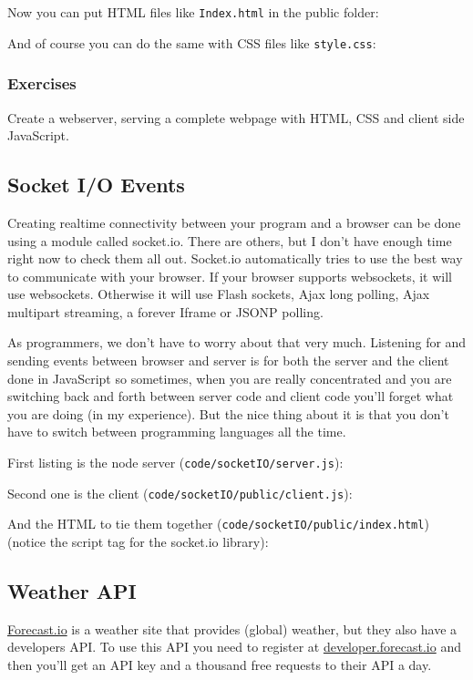 \documentclass[a4paper]{report}
\begin{document}
\noindent Now you can put HTML files like \texttt{Index.html} in the public folder: 
 
 
\noindent And of course you can do the same with CSS files like \texttt{style.css}: 
 
 
\subsubsection*{Exercises} 
Create a webserver, serving a complete webpage with HTML, CSS and client side JavaScript. 
 
\subsection*{Socket I/O Events} 
Creating realtime connectivity between your program and a browser can be done using a module called socket.io. There are others, but I don't have enough time right now to check them all out. Socket.io automatically tries to use the best way to communicate with your browser. If your browser supports websockets, it will use websockets. Otherwise it will use Flash sockets, Ajax long polling, Ajax multipart streaming, a forever Iframe or JSONP polling. 
 
As programmers, we don't have to worry about that very much. Listening for and sending events between browser and server is for both the server and the client done in JavaScript so sometimes, when you are really concentrated and you are switching back and forth between server code and client code you'll forget what you are doing (in my experience). But the nice thing about it is that you don't have to switch between programming languages all the time. 
 
First listing is the node server (\texttt{code/socketIO/server.js}): 
 
 
\noindent Second one is the client (\texttt{code/socketIO/public/client.js}): 
 
 
\noindent And the HTML to tie them together (\texttt{code/socketIO/public/index.html}) (notice the script tag for the socket.io library): 
 
 
\subsection*{Weather API} 
\href{http://forecast.io/}{Forecast.io} is a weather site that provides (global) weather, but they also have a developers API. To use this API you need to register at \href{https://developer.forecast.io/}{developer.forecast.io} and then you'll get an API key and a thousand free requests to their API a day. 
 
\end{document}
